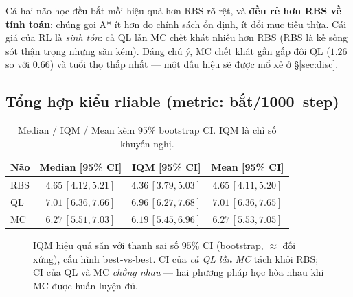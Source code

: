 \documentclass[11pt,a4paper]{article}
\newcommand{\catk}{bắt/1000}
\begin{document}
\noindent
Cả hai não học đều bắt mồi hiệu quả hơn RBS rõ rệt, và \textbf{đều rẻ hơn RBS về tính toán}: chúng
gọi A* ít hơn do chính sách ổn định, ít đổi mục tiêu thừa. Cái giá của RL là \emph{sinh tồn}: cả QL
lẫn MC chết khát nhiều hơn RBS (RBS là kẻ sống sót thận trọng nhưng săn kém). Đáng chú ý, MC chết
khát gần gấp đôi QL ($1.26$ so với $0.66$) và tuổi thọ thấp nhất --- một dấu hiệu sẽ được mổ xẻ ở
\S\ref{sec:disc}.

\subsection{Tổng hợp kiểu rliable (metric: \catk\ step)}

\begin{table}[h]
\centering
\caption{Median / IQM / Mean kèm $95\%$ bootstrap CI. IQM là chỉ số khuyến nghị.}
\label{tab:rliable}
\small
\begin{tabular}{lccc}
\toprule
Não & Median [95\% CI] & \textbf{IQM} [95\% CI] & Mean [95\% CI] \\
\midrule
RBS & $4.65\,[4.12,5.21]$ & $\mathbf{4.36\,[3.79,5.03]}$ & $4.65\,[4.11,5.20]$ \\
QL  & $7.01\,[6.36,7.66]$ & $\mathbf{6.96\,[6.27,7.68]}$ & $7.01\,[6.36,7.65]$ \\
MC  & $6.27\,[5.51,7.03]$ & $\mathbf{6.19\,[5.45,6.96]}$ & $6.27\,[5.53,7.05]$ \\
\bottomrule
\end{tabular}
\end{table}

\begin{figure}[h]
\centering
{}
\caption{IQM hiệu quả săn với thanh sai số $95\%$ CI (bootstrap, $\approx$ đối xứng), cấu hình
best-vs-best. CI của \emph{cả QL lẫn MC} tách khỏi RBS; CI của QL và MC \emph{chồng nhau} --- hai
phương pháp học hòa nhau khi MC được huấn luyện đủ.}
\label{fig:iqm}
\end{figure}
\end{document}
